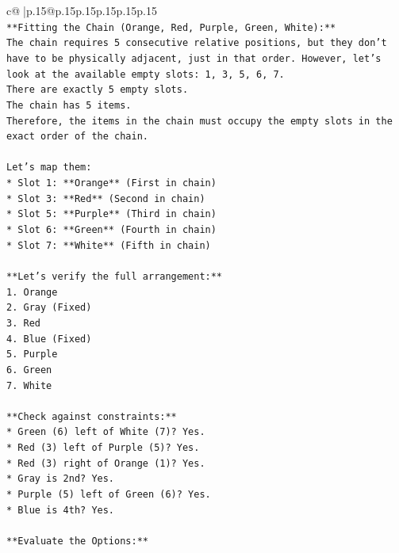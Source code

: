 \documentclass{article}
\begin{document}
{\begin{supertabular}{c@{$\;$}|p{.15\linewidth}@{}p{.15\linewidth}p{.15\linewidth}p{.15\linewidth}p{.15\linewidth}p{.15\linewidth}}
{{{\\ 
\texttt{**Fitting the Chain (Orange, Red, Purple, Green, White):**} \\
\texttt{The chain requires 5 consecutive relative positions, but they don't have to be physically adjacent, just in that order. However, let's look at the available empty slots: 1, 3, 5, 6, 7.} \\
\texttt{There are exactly 5 empty slots.} \\
\texttt{The chain has 5 items.} \\
\texttt{Therefore, the items in the chain must occupy the empty slots in the exact order of the chain.} \\
\\ 
\texttt{Let's map them:} \\
\texttt{*   Slot 1: **Orange** (First in chain)} \\
\texttt{*   Slot 3: **Red** (Second in chain)} \\
\texttt{*   Slot 5: **Purple** (Third in chain)} \\
\texttt{*   Slot 6: **Green** (Fourth in chain)} \\
\texttt{*   Slot 7: **White** (Fifth in chain)} \\
\\ 
\texttt{**Let's verify the full arrangement:**} \\
\texttt{1.  Orange} \\
\texttt{2.  Gray (Fixed)} \\
\texttt{3.  Red} \\
\texttt{4.  Blue (Fixed)} \\
\texttt{5.  Purple} \\
\texttt{6.  Green} \\
\texttt{7.  White} \\
\\ 
\texttt{**Check against constraints:**} \\
\texttt{*   Green (6) left of White (7)? Yes.} \\
\texttt{*   Red (3) left of Purple (5)? Yes.} \\
\texttt{*   Red (3) right of Orange (1)? Yes.} \\
\texttt{*   Gray is 2nd? Yes.} \\
\texttt{*   Purple (5) left of Green (6)? Yes.} \\
\texttt{*   Blue is 4th? Yes.} \\
\\ 
\texttt{**Evaluate the Options:**} \\
}}}
\end{supertabular}}
\end{document}
